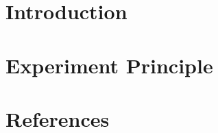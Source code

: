 \documentclass{article}
\begin{document}
\section{Introduction}
\section{Experiment Principle}
\section{References}
\end{document}
